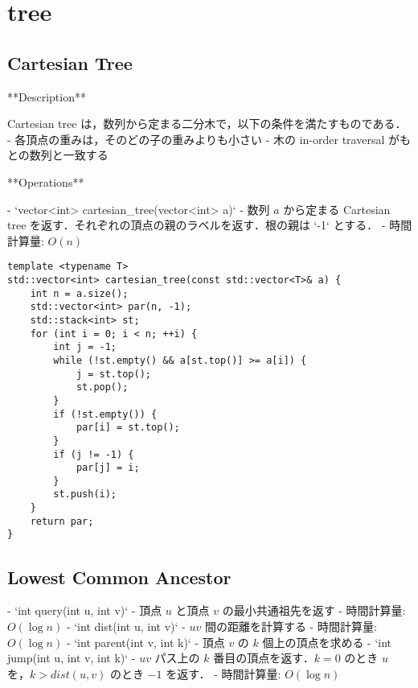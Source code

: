 \section{tree}

\subsection{Cartesian Tree}

\begin{small}
\begin{markdown}
**Description**

Cartesian tree は，数列から定まる二分木で，以下の条件を満たすものである．
- 各頂点の重みは，そのどの子の重みよりも小さい
- 木の in-order traversal がもとの数列と一致する

**Operations**

- `vector<int> cartesian\_tree(vector<int> a)`
    - 数列 $a$ から定まる Cartesian tree を返す．それぞれの頂点の親のラベルを返す．根の親は `-1` とする．
    - 時間計算量: $O(n)$

\end{markdown}
\end{small}

\begin{lstlisting}
template <typename T>
std::vector<int> cartesian_tree(const std::vector<T>& a) {
    int n = a.size();
    std::vector<int> par(n, -1);
    std::stack<int> st;
    for (int i = 0; i < n; ++i) {
        int j = -1;
        while (!st.empty() && a[st.top()] >= a[i]) {
            j = st.top();
            st.pop();
        }
        if (!st.empty()) {
            par[i] = st.top();
        }
        if (j != -1) {
            par[j] = i;
        }
        st.push(i);
    }
    return par;
}
\end{lstlisting}

\subsection{Lowest Common Ancestor}

\begin{small}
\begin{markdown}
- `int query(int u, int v)`
    - 頂点 $u$ と頂点 $v$ の最小共通祖先を返す
    - 時間計算量: $O(\log n)$
- `int dist(int u, int v)`
    - $uv$ 間の距離を計算する
    - 時間計算量: $O(\log n)$
- `int parent(int v, int k)`
    - 頂点 $v$ の $k$ 個上の頂点を求める
- `int jump(int u, int v, int k)`
    - $uv$ パス上の $k$ 番目の頂点を返す．$k=0$ のとき $u$ を，$k>dist(u,v)$ のとき $-1$ を返す．
    - 時間計算量: $O(\log n)$

\end{markdown}
\end{small}

